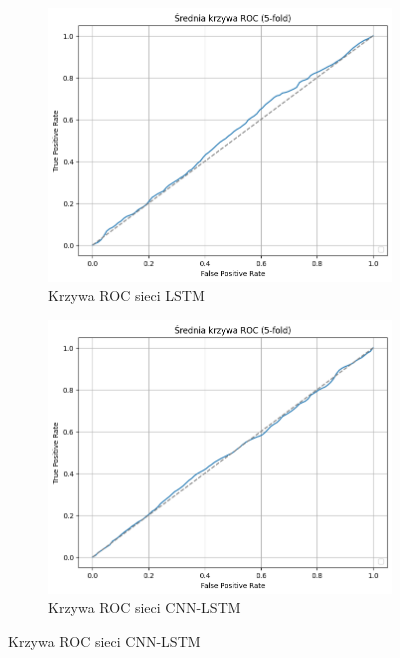\documentclass[a4paper,twoside,12pt]{book}
\begin{document}
\begin{figure}[!ht]
\begin{subfigure}[b]{0.49\textwidth}
		\label{cnn}
	\end{subfigure}
	\begin{subfigure}[b]{0.49\textwidth}
		\centering
		\includegraphics[width=\linewidth]{img/r5/kfold/bezcech_LSRM_roc_aug_0_52.png}
		\caption{Krzywa ROC sieci LSTM}
		\label{lstm}
	\end{subfigure}
	\begin{subfigure}[b]{0.49\textwidth}
		\centering
		\includegraphics[width=\linewidth]{img/r5/kfold/bezcech_CNNLSTM_roc_aug_0_50.png}
		\caption{Krzywa ROC sieci CNN-LSTM}
		\label{cnn-lstm}
	\end{subfigure}
\end{figure}
\end{document}
